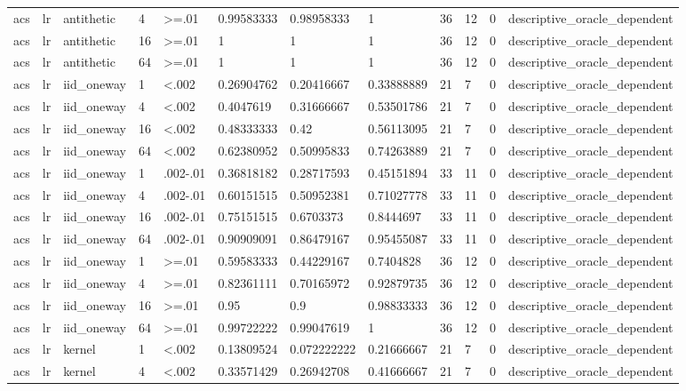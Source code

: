 \begin{tabular}{llllllllllll}
acs & lr & antithetic & 4 & >=.01 & 0.99583333 & 0.98958333 & 1 & 36 & 12 & 0 & descriptive\_oracle\_dependent \\
acs & lr & antithetic & 16 & >=.01 & 1 & 1 & 1 & 36 & 12 & 0 & descriptive\_oracle\_dependent \\
acs & lr & antithetic & 64 & >=.01 & 1 & 1 & 1 & 36 & 12 & 0 & descriptive\_oracle\_dependent \\
acs & lr & iid\_oneway & 1 & <.002 & 0.26904762 & 0.20416667 & 0.33888889 & 21 & 7 & 0 & descriptive\_oracle\_dependent \\
acs & lr & iid\_oneway & 4 & <.002 & 0.4047619 & 0.31666667 & 0.53501786 & 21 & 7 & 0 & descriptive\_oracle\_dependent \\
acs & lr & iid\_oneway & 16 & <.002 & 0.48333333 & 0.42 & 0.56113095 & 21 & 7 & 0 & descriptive\_oracle\_dependent \\
acs & lr & iid\_oneway & 64 & <.002 & 0.62380952 & 0.50995833 & 0.74263889 & 21 & 7 & 0 & descriptive\_oracle\_dependent \\
acs & lr & iid\_oneway & 1 & .002-.01 & 0.36818182 & 0.28717593 & 0.45151894 & 33 & 11 & 0 & descriptive\_oracle\_dependent \\
acs & lr & iid\_oneway & 4 & .002-.01 & 0.60151515 & 0.50952381 & 0.71027778 & 33 & 11 & 0 & descriptive\_oracle\_dependent \\
acs & lr & iid\_oneway & 16 & .002-.01 & 0.75151515 & 0.6703373 & 0.8444697 & 33 & 11 & 0 & descriptive\_oracle\_dependent \\
acs & lr & iid\_oneway & 64 & .002-.01 & 0.90909091 & 0.86479167 & 0.95455087 & 33 & 11 & 0 & descriptive\_oracle\_dependent \\
acs & lr & iid\_oneway & 1 & >=.01 & 0.59583333 & 0.44229167 & 0.7404828 & 36 & 12 & 0 & descriptive\_oracle\_dependent \\
acs & lr & iid\_oneway & 4 & >=.01 & 0.82361111 & 0.70165972 & 0.92879735 & 36 & 12 & 0 & descriptive\_oracle\_dependent \\
acs & lr & iid\_oneway & 16 & >=.01 & 0.95 & 0.9 & 0.98833333 & 36 & 12 & 0 & descriptive\_oracle\_dependent \\
acs & lr & iid\_oneway & 64 & >=.01 & 0.99722222 & 0.99047619 & 1 & 36 & 12 & 0 & descriptive\_oracle\_dependent \\
acs & lr & kernel & 1 & <.002 & 0.13809524 & 0.072222222 & 0.21666667 & 21 & 7 & 0 & descriptive\_oracle\_dependent \\
acs & lr & kernel & 4 & <.002 & 0.33571429 & 0.26942708 & 0.41666667 & 21 & 7 & 0 & descriptive\_oracle\_dependent \\

\end{tabular}
